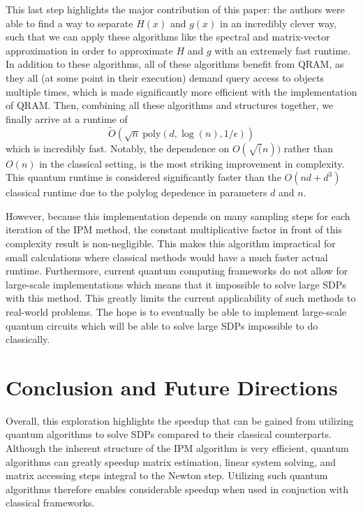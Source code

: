 \documentclass[11pt]{article}
\begin{document}
This last step highlights the major contribution of this paper: the authors were able to find a way to separate 
\( H(x) \) and \( g(x) \) in an incredibly clever way, such that we can apply these algorithms like the 
spectral and matrix-vector approximation in order to approximate \( H \) and \( g \) with an extremely fast 
runtime. In addition to these algorithms, all of these algorithms benefit from QRAM, as they all (at some point in their execution) demand query access to objects multiple times, which is made significantly more efficient with the implementation of QRAM. Then, combining all these algorithms and structures together, we finally arrive at a runtime of 
\[
	\widetilde O(\sqrt{n} \ \mathrm{poly}(d, \log(n), 1 / \epsilon))  
\] 
which is incredibly fast. Notably, the dependence on $O(\sqrt(n))$ rather than $O(n)$ in the classical setting, is the most striking improvement in complexity. This quantum runtime is considered significantly faster than the \( O(nd + d^3) \) classical runtime due to the polylog depedence in parameters $d$ and $n$.

However, because this implementation depends on many sampling steps for each iteration of the IPM method, the constant multiplicative factor in front of this complexity result is non-negligible. This makes this algorithm impractical for small calculations where classical methods would have a much faster actual runtime. Furthermore, current quantum computing frameworks do not allow for large-scale implementations which means that it impossible to solve large SDPs with this method. This greatly limits the current applicability of such methods to real-world problems. The hope is to eventually be able to implement large-scale quantum circuits which will be able to solve large SDPs impossible to do classically.

 

\section{Conclusion and Future Directions}
\label{conclusion}
Overall, this exploration highlights the speedup that can be gained from utilizing quantum algorithms to solve SDPs compared to their classical counterparts. Although the inherent structure of the IPM algorithm is very efficient, quantum algorithms can greatly speedup matrix estimation, linear system solving, and matrix accessing steps integral to the Newton step. Utilizing such quantum algorithms therefore enables considerable speedup when used in conjuction with classical frameworks. 
\end{document}
